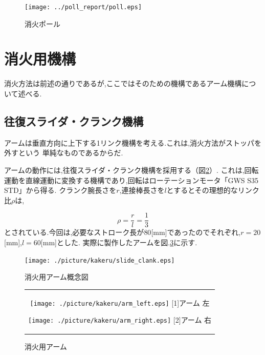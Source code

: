 \documentclass[11pt,a4]{jsarticle}
\begin{document}
\begin{figure}[t]
  \begin{center}
    \texttt{[image: ../poll\_report/poll.eps]}
    \caption{消火ポール}
    \label{poll}
  \end{center}
\end{figure}

\newpage

\section{消火用機構}
消火方法は前述の通りであるが,ここではそのための機構であるアーム機構について述べる.

\subsection{往復スライダ・クランク機構}
アームは垂直方向に上下する1リンク機構を考える.これは,消火方法がストッパを外すという
単純なものであるからだ.

アームの動作には,往復スライダ・クランク機構を採用する（図\ref{arm_con}）.
これは,回転運動を直線運動に変換する機構であり,回転はローテーションモータ「GWS S35 STD」から得る.
クランク腕長さを$r$,連接棒長さを$l$とするとその理想的なリンク比$\rho$は,

\begin{equation}
	\rho = \frac{r}{l}=\frac{1}{3}
\end{equation}
とされている.今回は,必要なストローク長が$80$[mm]であったのでそれぞれ,$r=20$[mm],$l=60$[mm]とした.
実際に製作したアームを図.\ref{arm_real}に示す.

\begin{figure}[h]
 \centering
   \texttt{[image: ./picture/kakeru/slide\_clank.eps]}
   \caption{消火用アーム概念図}
 \label{arm_con}
\end{figure}

\begin{figure}[h]
 \centering
 \begin{tabular}{c}

  \begin{minipage}{0.3\hsize}
   \centering
   \texttt{[image: ./picture/kakeru/arm\_left.eps]}
   \hspace{1.6cm} [1]アーム 左
  \end{minipage}

  \begin{minipage}{0.45\hsize}
   \centering
   \texttt{[image: ./picture/kakeru/arm\_right.eps]}
   \hspace{1.6cm} [2]アーム 右
  \end{minipage}
 \end{tabular}
 \caption{消火用アーム}
 \label{arm_real}
\end{figure}
\end{document}
